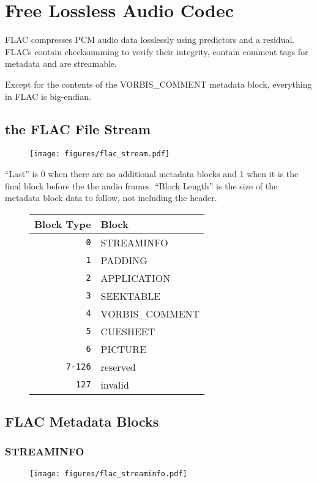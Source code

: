 \chapter{Free Lossless Audio Codec}
FLAC compresses PCM audio data losslessly using predictors and a
residual.
FLACs contain checksumming to verify their integrity, contain comment tags for
metadata and are streamable.

Except for the contents of the VORBIS\_COMMENT metadata block, everything in FLAC is big-endian.

\section{the FLAC File Stream}
\begin{figure}[h]
\texttt{[image: figures/flac\_stream.pdf]}
\end{figure}
\par
\noindent
``Last'' is 0 when there are no additional metadata blocks and 1 when
it is the final block before the the audio frames.
``Block Length'' is the size of the metadata block data to follow,
not including the header.
\begin{figure}[h]
\begin{tabular}{| r | l |}
\hline
Block Type & Block \\
\hline
\texttt{0} & STREAMINFO \\
\texttt{1} & PADDING \\
\texttt{2} & APPLICATION \\
\texttt{3} & SEEKTABLE \\
\texttt{4} & VORBIS\_COMMENT \\
\texttt{5} & CUESHEET \\
\texttt{6} & PICTURE \\
\texttt{7-126} & reserved \\
\texttt{127} & invalid \\
\hline
\end{tabular}
\end{figure}

\pagebreak

\section{FLAC Metadata Blocks}

\subsection{STREAMINFO}
\begin{figure}[h]
\texttt{[image: figures/flac\_streaminfo.pdf]}
\end{figure}

